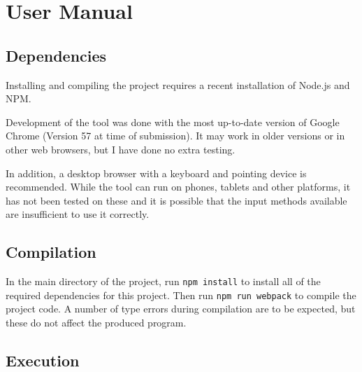 \documentclass[12pt,a4paper]{report}
\begin{document}
\renewcommand\bibname{References} %





\tableofcontents
\listoffigures

\newpage
{} %











\newpage
\appendix
\chapter{User Manual}

\section{Dependencies}

Installing and compiling the project requires a recent installation of Node.js and NPM.

Development of the tool was done with the most up-to-date version of Google Chrome (Version 57 at time of submission). It may work in older versions or in other web browsers, but I have done no extra testing.

In addition, a desktop browser with a keyboard and pointing device is recommended. While the tool can run on phones, tablets and other platforms, it has not been tested on these and it is possible that the input methods available are insufficient to use it correctly.

\section{Compilation}

In the main directory of the project, run \verb+npm install+ to install all of the required dependencies for this project. Then run \verb+npm run webpack+ to compile the project code. A number of type errors during compilation are to be expected, but these do not affect the produced program.

\section{Execution}
\end{document}
